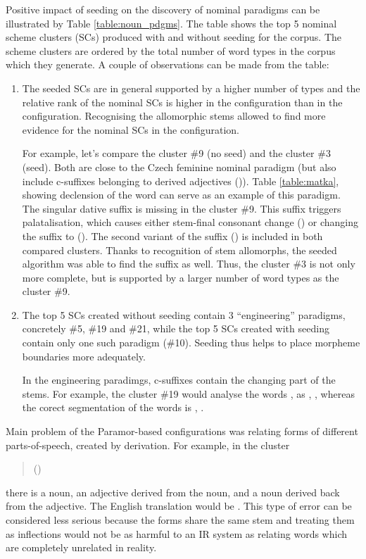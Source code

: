 Positive impact of seeding on the discovery of nominal paradigms can be illustrated by Table \ref{table:noun_pdgms}. The table shows the top 5 nominal scheme clusters (SCs) produced with and without seeding for the  corpus. The scheme clusters are ordered by the total number of word types in the corpus which they generate. A couple of observations can be made from the table:
\begin{enumerate}
\item The seeded SCs are in general supported by a higher number of types and the relative rank of the nominal SCs is higher in the  configuration than in the  configuration. Recognising the allomorphic stems allowed to find more evidence for the nominal SCs in the  configuration. 

For example, let's compare the cluster \#9 (no seed) and the cluster \#3 (seed). Both are close to the Czech feminine nominal paradigm  (but also include c-suffixes belonging to derived adjectives ()). Table \ref{table:matka}, showing declension of the word  can serve as an example of this paradigm. The singular dative suffix  is missing in the cluster \#9. This suffix triggers palatalisation, which causes either stem-final consonant change () or changing the suffix to  (). The second variant of the suffix () is included in both compared clusters. Thanks to recognition of stem allomorphs, the seeded algorithm was able to find the  suffix as well. Thus, the cluster \#3 is not only more complete, but is supported by a larger number of word types as the cluster \#9.

\item The top 5 SCs created without seeding contain 3 ``engineering'' paradigms, concretely \#5, \#19 and \#21, while the top 5 SCs created with seeding contain only one such paradigm (\#10). Seeding thus helps to place morpheme boundaries more adequately.

In the engineering paradimgs, c-suffixes contain the changing part of the stems. For example, the cluster \#19 would analyse the words ,  as , , whereas the corect segmentation of the words is , . 
\end{enumerate}

Main problem of the Paramor-based configurations was relating forms of different parts-of-speech, created by derivation. For example, in the cluster 
\begin{quote}()\end{quote}
there is a noun, an adjective derived from the noun, and a noun derived back from the adjective. The English translation would be . This type of error can be considered less serious because the forms share the same stem and treating them as inflections would not be as harmful to an IR system as relating words which are completely unrelated in reality.

